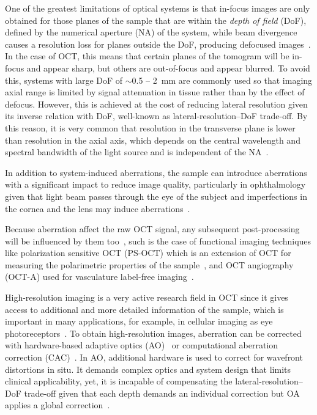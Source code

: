 One of the greatest limitations of optical systems is that in-focus images are only obtained for those planes of the sample that are within the \textit{depth of field} (DoF), defined by the numerical aperture (NA) of the system, while beam divergence causes a resolution loss for planes outside the DoF, producing defocused images~\cite{Yasuno2006_Noniterative, Ralston2006_Interferometric}. In the case of OCT, this means that certain planes of the tomogram will be in-focus and appear sharp, but others are out-of-focus and appear blurred. To avoid this, systems with large DoF of $\sim$0.5 -- 2~mm are commonly used so that imaging axial range is limited by signal attenuation in tissue rather than by the effect of defocus. However, this is achieved at the cost of reducing lateral resolution given its inverse relation with DoF, well-known as lateral-resolution--DoF trade-off. By this reason, it is very common that resolution in the transverse plane is lower than resolution in the axial axis, which depends on the central wavelength and spectral bandwidth of the light source and is independent of the NA~\cite{Fujimoto2015_Introduction}.

In addition to system-induced aberrations, the sample can introduce aberrations with a significant impact to reduce image quality, particularly in ophthalmology given that light beam passes through the eye of the subject and imperfections in the cornea and the lens may induce aberrations~\cite{Walsh1984_Objective, Liang1997_Aberrations}.

Because aberration affect the raw OCT signal, any subsequent post-processing will be influenced by them too~\cite{Cense2009_Retinal, Park2020_Angiographic}, such is the case of functional imaging techniques like polarization sensitive OCT (PS-OCT) which is an extension of OCT for measuring the polarimetric properties of the sample~\cite{deBoer1997_Twodimensional}, and OCT angiography (OCT-A) used for vasculature label-free imaging~\cite{Wang2007_Three}.

High-resolution imaging is a very active research field in OCT since it gives access to additional and more detailed information of the sample, which is important in many applications, for example, in cellular imaging as eye photoreceptors~\cite{Zhang2006_Highspeed}. To obtain high-resolution images, aberration can be corrected with hardware-based adaptive optics (AO)~\cite{Zawadzki2005_Adaptiveoptics} or computational aberration correction (CAC)~\cite{Adie2012_Computational}. In AO, additional hardware is used to correct for wavefront distortions in situ. It demands complex optics and system design that limits clinical applicability, yet, it is incapable of compensating the lateral-resolution--DoF trade-off given that each depth demands an individual correction but OA applies a global correction~\cite{Pircher2017_Review}.

